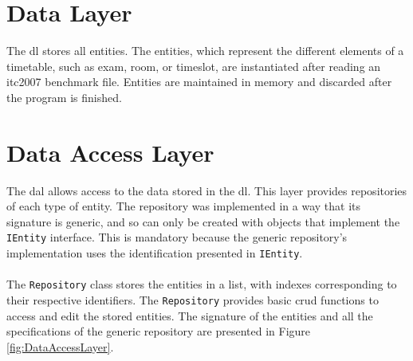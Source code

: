 \section{Data Layer}

The \gls{dl} stores all entities. The entities, which represent the different elements of a timetable, such as exam, room, or timeslot, are instantiated after reading an \gls{itc2007} benchmark file. Entities are maintained in memory and discarded after the program is finished.

\section{Data Access Layer}

The \gls{dal} allows access to the data stored in the \gls{dl}. This layer provides repositories of each type of entity. The repository was implemented in a way that its signature is generic, and so can only be created with objects that implement the \verb+IEntity+ interface. This is mandatory because the generic repository's implementation uses the identification presented in \verb+IEntity+. \\
\\
The \verb+Repository+ class stores the entities in a list, with indexes corresponding to their respective identifiers. The \verb+Repository+ provides basic \gls{crud} functions to access and edit the stored entities. The signature of the entities and all the specifications of the generic repository are presented in Figure \ref{fig:DataAccessLayer}.\\

